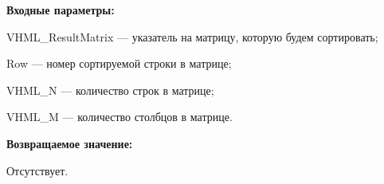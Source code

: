 \textbf{Входные параметры:}
 
VHML\_ResultMatrix --- указатель на матрицу, которую будем сортировать;
 
Row --- номер сортируемой строки в матрице;
 
VHML\_N --- количество строк в матрице;
 
VHML\_M --- количество столбцов в матрице.

\textbf{Возвращаемое значение:}

Отсутствует.